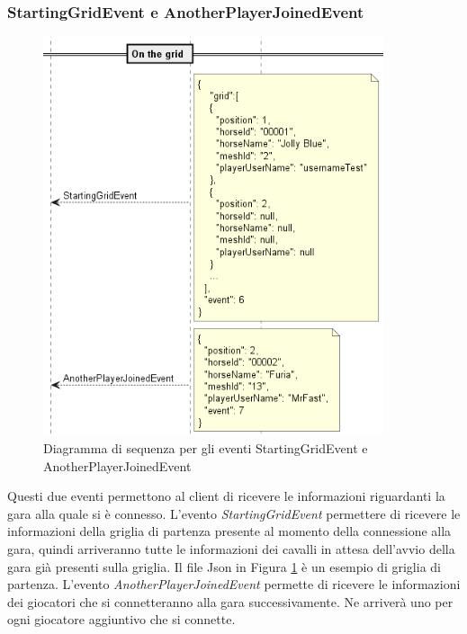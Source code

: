         \subsubsection{StartingGridEvent e AnotherPlayerJoinedEvent}

        \begin{figure}[!ht]\label{img:StartingGrid}
            \centering
            \includegraphics[width=10cm]{figure/StartingGrid.png}
            \caption{Diagramma di sequenza per gli eventi StartingGridEvent e AnotherPlayerJoinedEvent}
        \end{figure}

        Questi due eventi permettono al client di ricevere le informazioni riguardanti la gara alla quale si è connesso.
        L'evento \textit{StartingGridEvent} permettere di ricevere le informazioni della griglia di partenza presente al momento della connessione alla gara, quindi arriveranno tutte le informazioni dei cavalli in attesa dell'avvio della gara già presenti sulla griglia.
        Il file Json in Figura \ref{img:StartingGrid} è un esempio di griglia di partenza.
        L'evento \textit{AnotherPlayerJoinedEvent} permette di ricevere le informazioni dei giocatori che si connetteranno alla gara successivamente.
        Ne arriverà uno per ogni giocatore aggiuntivo che si connette.
        
